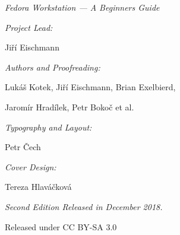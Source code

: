 \newpage\mbox{}\newpage
\begin{center}

{\it\large Fedora Workstation --- A Beginners Guide}

\bigskip

{\it Project Lead:}

Jiří Eischmann

\medskip

{\it Authors and Proofreading:}

Lukáš Kotek, Jiří Eischmann, Brian Exelbierd,

Jaromír Hradílek, Petr Bokoč et al.

\medskip

{\it Typography and Layout:}

Petr Čech

\medskip

{\it Cover Design:}

Tereza Hlaváčková

\medskip

{\it Second Edition Released in December 2018.

Released under CC BY-SA 3.0}
\end{center}
